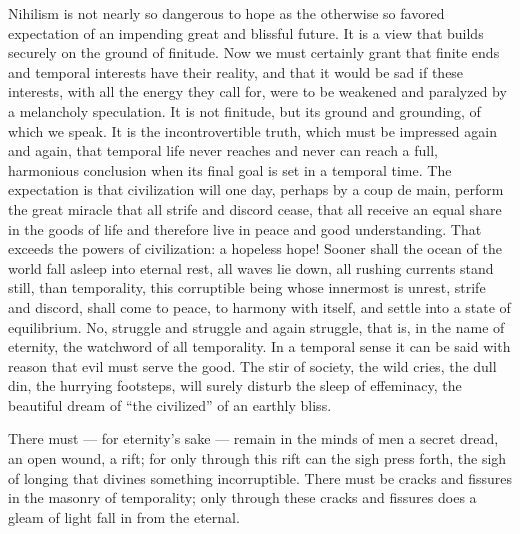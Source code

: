 \documentclass[12pt,a4paper,openany]{book}
\newcommand{\opage}[1]{\marginnote{\footnotesize\textit{[#1]}}}
\begin{document}
\setcounter{footnote}{0}%
\opage{50}Nihilism is not nearly so dangerous to hope as the otherwise so favored expectation of
an impending great and blissful future. It is a view that builds securely on the ground of
finitude. Now we must certainly grant that finite ends and temporal interests have their
reality, and that it would be sad if these interests, with all the energy they call for, were
to be weakened and paralyzed by a melancholy speculation. It is not finitude, but its ground and
grounding, of which we speak. It is the incontrovertible truth, which must be impressed again
and again, that temporal life never reaches and never can reach a full, harmonious conclusion
when its final goal is set in a temporal time. The expectation is that civilization will one
day, perhaps by a coup de main, perform the great miracle that all strife and discord cease,
that all receive an equal share in the goods of life and therefore live in peace and good
understanding. That exceeds the powers of civilization: a hopeless hope! Sooner shall the ocean
of the world fall asleep into eternal rest, all waves lie down, all rushing currents stand
still, than temporality, this corruptible being whose innermost is unrest, strife and discord,
shall come to peace, to harmony with itself, and settle into a state of equilibrium. No,
struggle and struggle and again struggle, that is, in the name of eternity, the watchword of
all temporality. In a temporal sense it can be said with reason that evil must serve the good.
The stir of society, the wild cries, the dull din, the hurrying footsteps, will surely disturb
the sleep of effeminacy, the beautiful dream of ``the civilized'' of an earthly bliss.

There must --- for eternity's sake --- remain in the minds of men a secret dread, an open
wound, a
\setcounter{footnote}{0}%
\opage{51}rift; for only through this rift can the sigh press forth, the sigh of longing that
divines something incorruptible. There must be cracks and fissures in the masonry of
temporality; only through these cracks and fissures does a gleam of light fall in from the
eternal.
\end{document}
